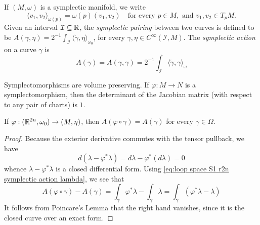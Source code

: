 \documentclass[../main-v2-manifolds.tex]{subfiles}
\begin{document}
\begin{definition}
    If $(M,\omega)$ is a symplectic manifold, we write
    \[
        \langle v_{1}, v_{2}\rangle_{\omega(p)} = \omega(p)(v_1, v_2)\quad\text{for every }p\in M,\text{ and } v_{1},v_2\in T_pM.
    \]
    Given an interval $\mathcal{I}\subseteq\mathbb{R}$, the \emph{symplectic pairing} between two curves is defined to be $A(\gamma,\eta) = 2^{-1}\int_{\mathcal{I}} \langle \mathring{\gamma},\eta\rangle_{\omega_0}$, for every $\gamma,\eta\in C^\infty(\mathcal{I}, M)$. The \emph{symplectic action} on a curve $\gamma$ is 
    \[
        A(\gamma) = A(\gamma,\gamma) =2^{-1}\int_{\mathcal{I}}\langle\mathring{\gamma},\gamma\rangle_{\omega}
    \]
\end{definition}
%
%
%
\begin{remark}
    Symplectomorphisms are volume preserving. If $\varphi:M\to N$ is a symplectomorphism, then the determinant of the Jacobian matrix (with respect to any pair of charts) is $1$.
\end{remark}
%
\begin{lemma}\label{lem:symplectomorphisms from realtn preserve symplectic action}
    If $\varphi:({\mathbb{R}^{2n}},\omega_0)\to (M,\eta)$, then $A(\varphi\circ\gamma) = A(\gamma)$ for every $\gamma\in \Omega$.
\end{lemma}
\begin{proof}
    Because the exterior derivative commutes with the tensor pullback, we have
    \[
        d(\lambda - \varphi^*\lambda) = d\lambda - \varphi^*(d\lambda)= 0
    \]
    whence $\lambda - \varphi^*\lambda$ is a closed differential form. Using \cref{eq:loop space S1 r2n symplectic action lambda}, we see that
    \[
        A(\varphi\circ\gamma) - A(\gamma) = \int_{\gamma}\varphi^*\lambda - \int_{\gamma}\lambda = \int_{\gamma}(\varphi^*\lambda - \lambda)
    \]
    It follows from Poincare's Lemma that the right hand vanishes, since it is the closed curve over an exact form.
\end{proof}
\end{document}
